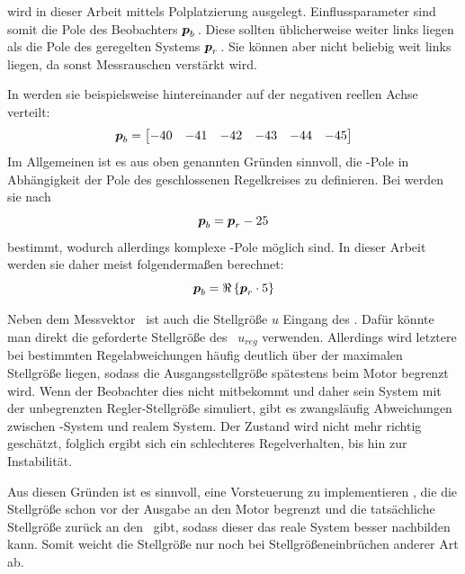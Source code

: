  wird in dieser Arbeit mittels Polplatzierung ausgelegt. 
Einflussparameter sind somit die Pole des Beobachters $\boldsymbol{p}_b$\,. 
Diese sollten üblicherweise weiter links liegen als die Pole des geregelten Systems $\boldsymbol{p}_r$\,. 
Sie können aber nicht beliebig weit links liegen, da sonst Messrauschen verstärkt wird.

In \cite{brehl} werden sie beispielsweise hintereinander auf der negativen reellen Achse verteilt:
	\[
	\boldsymbol{p}_b=\begin{bmatrix}
		-40 & -41 & -42 & -43 & -44 & -45
	\end{bmatrix}
\]
Im Allgemeinen ist es aus oben genannten Gründen sinnvoll, die \beob-Pole in Abhängigkeit der Pole des geschlossenen Regelkreises zu definieren.
Bei \cite{chang} werden sie nach
	\[
	\boldsymbol{p}_b = \boldsymbol{p}_r - 25
\]
bestimmt, wodurch allerdings komplexe \beob-Pole möglich sind. In dieser Arbeit werden sie daher meist folgendermaßen berechnet:
	\[
	\boldsymbol{p}_b = \Re\left\{{\boldsymbol{p}_r \cdot 5}\right\}
\]

Neben dem Messvektor \vey\ ist auch die Stellgröße $u$ Eingang des \beob. 
Dafür könnte man direkt die geforderte Stellgröße des \zsr\ $u_{reg}$ verwenden.
Allerdings wird letztere bei bestimmten Regelabweichungen häufig deutlich über der maximalen Stellgröße liegen, sodass die Ausgangsstellgröße spätestens beim Motor begrenzt wird.
Wenn der Beobachter dies nicht mitbekommt und daher sein System mit der unbegrenzten Regler-Stellgröße simuliert, gibt es zwangsläufig Abweichungen zwischen \beob-System und realem System.
Der Zustand wird nicht mehr richtig geschätzt, folglich ergibt sich ein schlechteres Regelverhalten, bis hin zur Instabilität.

Aus diesen Gründen ist es sinnvoll, eine Vorsteuerung zu implementieren , die die Stellgröße schon vor der Ausgabe an den Motor begrenzt und die tatsächliche Stellgröße zurück an den \beob\ gibt, sodass dieser das reale System besser nachbilden kann.
Somit weicht die Stellgröße nur noch bei Stellgrößeneinbrüchen anderer Art  ab.


\subsubsection{\diff}

